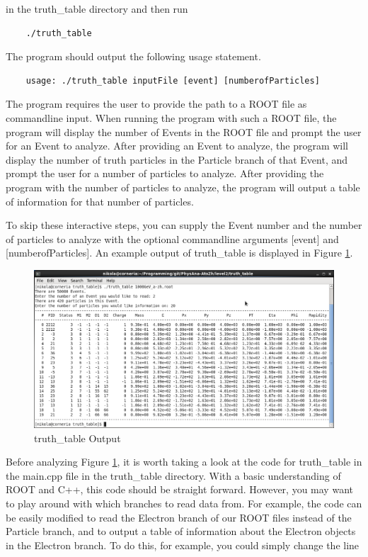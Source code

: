 \documentclass{article}
\begin{document}
in the truth\_table directory and then run

\begin{verbatim}
	./truth_table
\end{verbatim}

The program should output the following usage statement.

\begin{verbatim}
	usage: ./truth_table inputFile [event] [numberofParticles]
\end{verbatim}

The program requires the user to provide the path to a ROOT file as commandline input.
When running the program with such a ROOT file, the program will display the number of
Events in the ROOT file and prompt the user for an Event to analyze. After providing an
Event to analyze, the program will display the number of truth particles in the Particle
branch of that Event, and prompt the user for a number of particles to analyze. After
providing the program with the number of particles to analyze, the program will output
a table of information for that number of particles.

\bigskip

To skip these interactive steps, you can supply the Event number and the number of
particles to analyze with the optional commandline arguments [event] and [numberofParticles].
An example output of truth\_table is displayed in Figure \ref{fig:truthTableOutput}.

\begin{figure}[h]
	\centering
	\includegraphics[width = \linewidth]{truth_table_screenshot.png}
	\caption{truth\_table Output}
	\label{fig:truthTableOutput}
\end{figure}

\bigskip

Before analyzing Figure \ref{fig:truthTableOutput}, it is worth taking a look at the code for
truth\_table in the main.cpp file in the truth\_table directory. With a basic understanding of
ROOT and C++, this code should be straight forward. However, you may want to play around with
which branches to read data from. For example, the code can be easily modified to read the
Electron branch of our ROOT files instead of the Particle branch, and to output a table of
information about the Electron objects in the Electron branch. To do this, for example, you
could simply change the line
\end{document}
